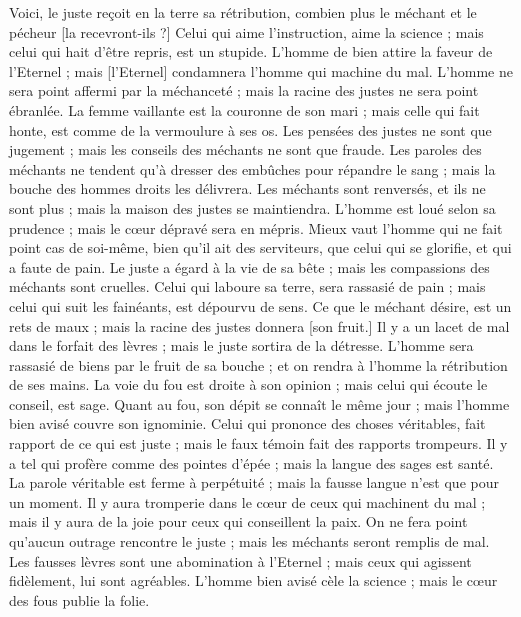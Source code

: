 \begin{multicols}{2}
Voici, le juste reçoit en la terre sa rétribution, combien plus le méchant et le pécheur [la recevront-ils ?]
\VerseOne{}Celui qui aime l'instruction, aime la science ; mais celui qui hait d'être repris, est un stupide.
L'homme de bien attire la faveur de l'Eternel ; mais [l'Eternel] condamnera l'homme qui machine du mal.
L'homme ne sera point affermi par la méchanceté ; mais la racine des justes ne sera point ébranlée.
La femme vaillante est la couronne de son mari ; mais celle qui fait honte, est comme de la vermoulure à ses os.
Les pensées des justes ne sont que jugement ; mais les conseils des méchants ne sont que fraude.
Les paroles des méchants ne tendent qu'à dresser des embûches pour répandre le sang ; mais la bouche des hommes droits les délivrera.
Les méchants sont renversés, et ils ne sont plus ; mais la maison des justes se maintiendra.
L'homme est loué selon sa prudence ; mais le cœur dépravé sera en mépris.
Mieux vaut l'homme qui ne fait point cas de soi-même, bien qu'il ait des serviteurs, que celui qui se glorifie, et qui a faute de pain.
Le juste a égard à la vie de sa bête ; mais les compassions des méchants sont cruelles.
Celui qui laboure sa terre, sera rassasié de pain ; mais celui qui suit les fainéants, est dépourvu de sens.
Ce que le méchant désire, est un rets de maux ; mais la racine des justes donnera [son fruit.]
Il y a un lacet de mal dans le forfait des lèvres ; mais le juste sortira de la détresse.
L'homme sera rassasié de biens par le fruit de sa bouche ; et on rendra à l'homme la rétribution de ses mains.
La voie du fou est droite à son opinion ; mais celui qui écoute le conseil, est sage.
Quant au fou, son dépit se connaît le même jour ; mais l'homme bien avisé couvre son ignominie.
Celui qui prononce des choses véritables, fait rapport de ce qui est juste ; mais le faux témoin fait des rapports trompeurs.
Il y a tel qui profère comme des pointes d'épée ; mais la langue des sages est santé.
La parole véritable est ferme à perpétuité ; mais la fausse langue n'est que pour un moment.
Il y aura tromperie dans le cœur de ceux qui machinent du mal ; mais il y aura de la joie pour ceux qui conseillent la paix.
On ne fera point qu'aucun outrage rencontre le juste ; mais les méchants seront remplis de mal.
Les fausses lèvres sont une abomination à l'Eternel ; mais ceux qui agissent fidèlement, lui sont agréables.
L'homme bien avisé cèle la science ; mais le cœur des fous publie la folie.

\end{multicols}
